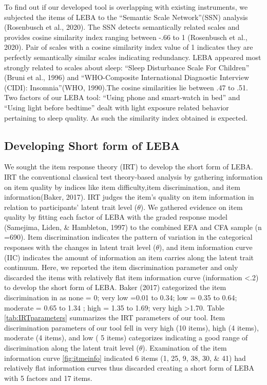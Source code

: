 \documentclass[
  english,
  man]{apa6}
\begin{document}
To find out if our developed tool is overlapping with existing instruments, we subjected the items of LEBA to the ``Semantic Scale Network''(SSN) analysis (Rosenbusch et al., 2020). The SSN detects semantically related scales and provides cosine similarity index ranging between -.66 to 1 (Rosenbusch et al., 2020). Pair of scales with a cosine similarity index value of 1 indicates they are perfectly semantically similar scales indicating redundancy. LEBA appeared most strongly related to scales about sleep: ``Sleep Disturbance Scale For Children'' (Bruni et al., 1996) and ``WHO-Composite International Diagnostic Interview (CIDI): Insomnia''(WHO, 1990).The cosine similarities lie between .47 to .51. Two factors of our LEBA tool: ``Using phone and smart-watch in bed'' and ``Using light before bedtime'' dealt with light exposure related behavior pertaining to sleep quality. As such the similarity index obtained is expected.

\hypertarget{developing-short-form-of-leba}{%
\subsection{Developing Short form of LEBA}\label{developing-short-form-of-leba}}

We sought the item response theory (IRT) to develop the short form of LEBA. IRT the conventional classical test theory-based analysis by gathering information on item quality by indices like item difficulty,item discrimination, and item information(Baker, 2017). IRT judges the item's quality on item information in relation to participants' latent trait level (\(\theta\)). We gathered evidence on item quality by fitting each factor of LEBA with the graded response model (Samejima, Liden, \& Hambleton, 1997) to the combined EFA and CFA sample (n =690). Item discrimination indicates the pattern of variation in the categorical responses with the changes in latent trait level (\(\theta\)), and item information curve (IIC) indicates the amount of information an item carries along the latent trait continuum. Here, we reported the item discrimination parameter and only discarded the items with relatively flat item information curve (information \textless.2) to develop the short form of LEBA. Baker (2017) categorized the item discrimination in as none = 0; very low =0.01 to 0.34; low = 0.35 to 0.64; moderate = 0.65 to 1.34 ; high = 1.35 to 1.69; very high \textgreater1.70. Table \ref{tab:IRTparameters} summarizes the IRT parameters of our tool. Item discrimination parameters of our tool fell in very high (10 items), high (4 items), moderate (4 items), and low ( 5 items) categorizes indicating a good range of discrimination along the latent trait level (\(\theta\)). Examination of the item information curve \ref{fig:itmeinfo} indicated 6 items (1, 25, 9, 38, 30, \& 41) had relatively flat information curves thus discarded creating a short form of LEBA with 5 factors and 17 items.
\end{document}
